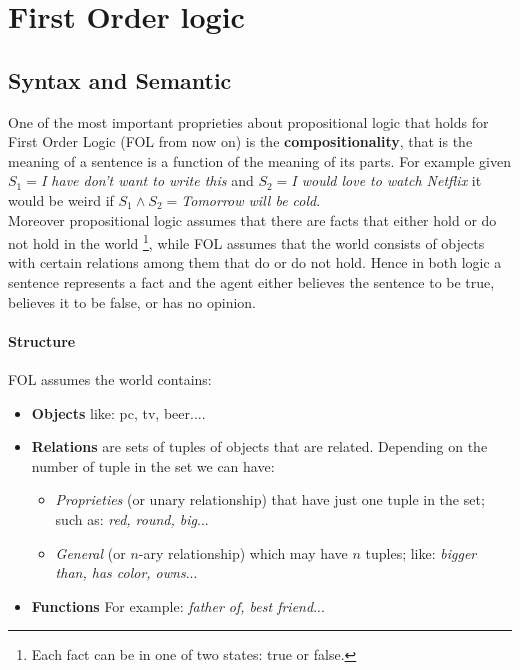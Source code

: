 \documentclass[10pt,a4paper]{article}
\begin{document}
\newpage
\section{First Order logic}

\subsection{Syntax and Semantic}

One of the most important proprieties about propositional logic that holds for First Order Logic (FOL from now on) is the \textbf{compositionality}, that is the meaning of a sentence is a function of the meaning of its parts. For example given $S_1=$\textit{I have don't want to write this} and $S_2=$\textit{I would love to watch Netflix} it would be weird if $S_1 \wedge S_2=$\textit{Tomorrow will be cold}.\\
Moreover propositional logic assumes that there are facts that either hold or do not hold in the world \footnote{Each fact can be in one of two states: true or false.}, while FOL assumes that the world consists of objects with certain relations among them that do or do not hold. Hence in both logic a sentence represents a fact and the agent either believes the sentence to be true, believes it to be false, or has no opinion. 

\paragraph{Structure}
FOL assumes the world contains:
\begin{itemize}
\item \textbf{Objects} like: pc, tv, beer....
\item \textbf{Relations} are sets of tuples of objects that are related. Depending on the number of tuple in the set we can have:
	\begin{itemize}
	\item \textit{Proprieties} (or unary relationship) that have just one tuple in the set; such as: \textit{red, round, big}...
	\item \textit{General} (or $n$-ary relationship)  which may have $n$ tuples; like:\textit{ bigger than, has color, owns}...
	\end{itemize}

\item \textbf{Functions}  For example: \textit{father of, best friend}...
\end{itemize}
\end{document}
